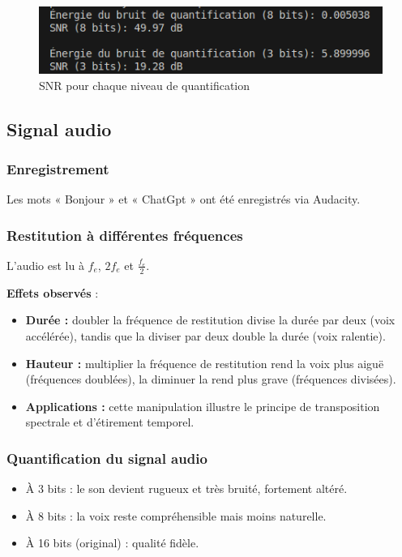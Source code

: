 \begin{figure}[!h]
\centering
\includegraphics{screenshots/snr_quantification.png}
\caption{SNR pour chaque niveau de quantification}
\end{figure}

\subsection{Signal audio}

\subsubsection{Enregistrement}

Les mots « Bonjour » et « ChatGpt » ont été enregistrés via Audacity. 

\subsubsection{Restitution à différentes fréquences}

L’audio est lu à \( f_e \), \( 2 f_e \) et \( \frac{f_e}{2} \). 

\textbf{Effets observés} :

\begin{itemize}
    \item \textbf{Durée :} doubler la fréquence de restitution divise la durée par deux (voix accélérée), tandis que la diviser par deux double la durée (voix ralentie).
    \item \textbf{Hauteur :} multiplier la fréquence de restitution rend la voix plus aiguë (fréquences doublées), la diminuer la rend plus grave (fréquences divisées).
    \item \textbf{Applications :} cette manipulation illustre le principe de transposition spectrale et d’étirement temporel.
\end{itemize}

\subsubsection{Quantification du signal audio}

\begin{itemize}
    \item À 3 bits : le son devient rugueux et très bruité, fortement altéré.
    \item À 8 bits : la voix reste compréhensible mais moins naturelle.
    \item À 16 bits (original) : qualité fidèle.
\end{itemize}

